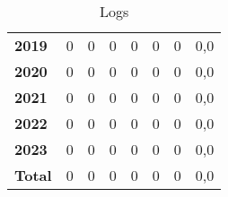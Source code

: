 \begin{table}[h!]
\begin{adjustbox}{width=1.5\textwidth, center}
\begin{tabular}{|l|r|r|r|r|r|r|r|}
        \textbf{2019}       & 0                     & 0                                 & 0                         & 0                                     & 0                         & 0                             & 0,0                               \\
        \textbf{2020}       & 0                     & 0                                 & 0                         & 0                                     & 0                         & 0                             & 0,0                               \\
        \textbf{2021}       & 0                     & 0                                 & 0                         & 0                                     & 0                         & 0                             & 0,0                               \\
        \textbf{2022}       & 0                     & 0                                 & 0                         & 0                                     & 0                         & 0                             & 0,0                               \\
        \textbf{2023}       & 0                     & 0                                 & 0                         & 0                                     & 0                         & 0                             & 0,0                               \\
        \textbf{Total}      & 0                     & 0                                 & 0                         & 0                                     & 0                         & 0                             & 0,0                               \\
        \hline
    \end{tabular}
    \end{adjustbox}
    \caption{Logs}
    \label{tab:logs-table}
\end{table}
